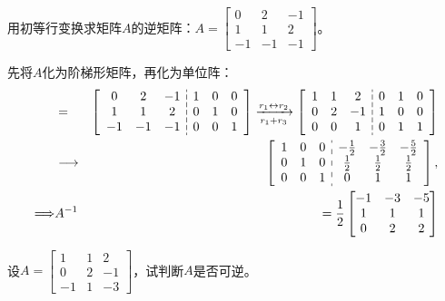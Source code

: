 \begin{eg}
用初等行变换求矩阵$A$的逆矩阵：$A = \begin{bmatrix} 0 & 2 & -1 \\ 1 & 1 & 2 \\ -1 & -1 & -1 \end{bmatrix}$。
\end{eg}

\begin{solution}
先将$A$化为阶梯形矩阵，再化为单位阵：
\begin{eqnarray*}
[A,I] & = &
  \setlength{\dashlinegap}{2pt}
  \left[ \begin{array}{ccc:ccc}
    0 & 2 & -1 & 1 & 0 & 0 \\ 1 & 1 & 2 & 0 & 1 & 0 \\ -1 & -1 & -1 & 0 & 0 & 1
  \end{array} \right] \xrightarrow[r_1+r_3]{r_1\leftrightarrow r_2}
  \left[ \begin{array}{ccc:ccc}
     1 & 1 & 2 & 0 & 1 & 0 \\ 0 & 2 & -1 & 1 & 0 & 0 \\ 0 & 0 & 1 & 0 & 1 & 1
  \end{array} \right] \\
  & \longrightarrow & \left[ \begin{array}{ccc:ccc}
     1 & 0 & 0 & -\frac12 & -\frac32 & -\frac52 \\ 0 & 1 & 0 & \frac12 & \frac12 & \frac12 \\ 0 & 0 & 1 & 0 & 1 & 1 \end{array} \right], \\
\Longrightarrow & A^{-1} & = \frac12\begin{bmatrix} -1 & -3 & -5 \\ 1 & 1 & 1 \\ 0 & 2 & 2 \end{bmatrix}
\end{eqnarray*}
\end{solution}

\begin{eg}
设$A = \begin{bmatrix} 1 & 1 & 2 \\ 0 & 2 & -1 \\ -1 & 1 & -3 \end{bmatrix}$，试判断$A$是否可逆。
\end{eg}

